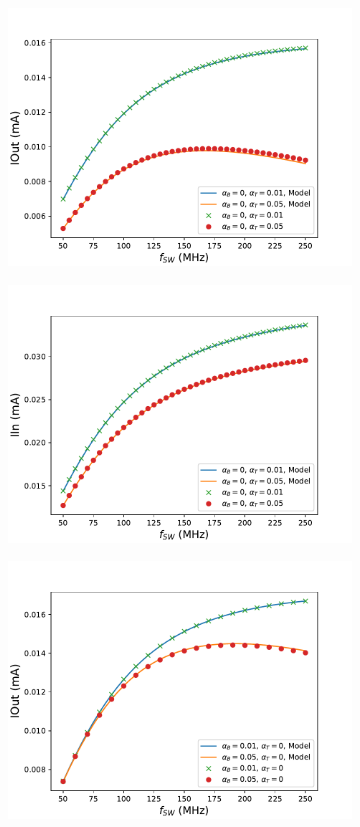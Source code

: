 \begin{figure}
\begin{subfigure}{0.48\linewidth}
			\includegraphics[width=\linewidth]{4Terminal/Figures/IOUT_2_BF.pdf}
		\end{subfigure}
		\begin{subfigure}{0.48\linewidth}
			\includegraphics[width=\linewidth]{4Terminal/Figures/IIN_2_BF.pdf}
		\end{subfigure}
		\begin{subfigure}{0.48\linewidth}
			\includegraphics[width=\linewidth]{4Terminal/Figures/IOUT_3_BF.pdf}

\end{subfigure}
\end{figure}
